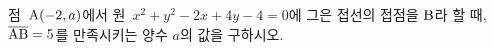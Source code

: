 점~$\mathrm{A}(-2{,}\mkern3mu\mathopen{}a)$에서 원~$x^2+y^2-2x+4y-4=0$에 그은 접선의 접점을 $\mathrm{B}$라 할 때, $\overline{\mathrm{AB}}=5$를 만족시키는 양수 $a$의 값을 구하시오.
